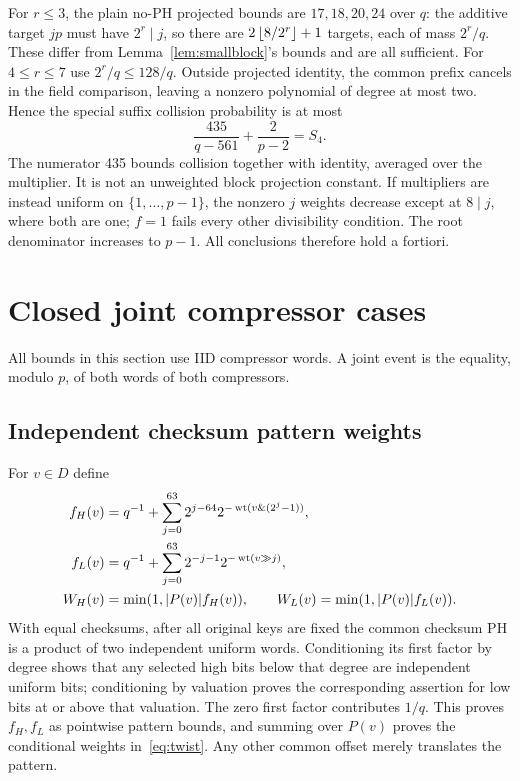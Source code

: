 For $r\le3$, the plain no-PH projected bounds are $17,18,20,24$ over $q$: the additive target $jp$ must have $2^r\mid j$, so there are $2\left\lfloor8/2^r\right\rfloor+1$ targets, each of mass $2^r/q$. These differ from Lemma~\ref{lem:smallblock}'s bounds and are all sufficient. For $4\le r\le7$ use $2^r/q\le128/q$. Outside projected identity, the common prefix cancels in the field comparison, leaving a nonzero polynomial of degree at most two. Hence the special suffix collision probability is at most
\[
 \frac{435}{q-561}+\frac2{p-2}=S_4.
\]
The numerator 435 bounds collision together with identity, averaged over the multiplier. It is not an unweighted block projection constant. If multipliers are instead uniform on $\{1,\ldots,p-1\}$, the nonzero $j$ weights decrease except at $8\mid j$, where both are one; $f=1$ fails every other divisibility condition. The root denominator increases to $p-1$. All conclusions therefore hold a fortiori.

\section{Closed joint compressor cases}\label{sec:joint}
All bounds in this section use IID compressor words. A joint event is the equality, modulo $p$, of both words of both compressors.

\subsection{Independent checksum pattern weights}
For $v\in D$ define
\begin{align}
 f_H(v)&=q^{-1}+\sum_{j=0}^{63}2^{j-64}2^{-\operatorname{wt}(v\mathbin{\&}(2^j-1))},\nonumber\\
 f_L(v)&=q^{-1}+\sum_{j=0}^{63}2^{-j-1}2^{-\operatorname{wt}(v\mathbin{\gg}j)},\label{eq:twist}\\
 W_H(v)&=\min(1,|P(v)|f_H(v)),\qquad
 W_L(v)=\min(1,|P(v)|f_L(v)).\nonumber
\end{align}
With equal checksums, after all original keys are fixed the common checksum PH is a product of two independent uniform words. Conditioning its first factor by degree shows that any selected high bits below that degree are independent uniform bits; conditioning by valuation proves the corresponding assertion for low bits at or above that valuation. The zero first factor contributes $1/q$. This proves $f_H,f_L$ as pointwise pattern bounds, and summing over $P(v)$ proves the conditional weights in~\eqref{eq:twist}. Any other common offset merely translates the pattern.

